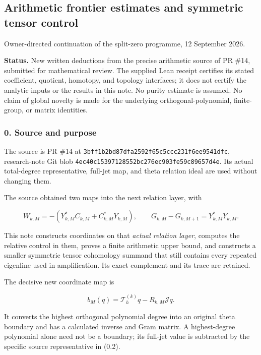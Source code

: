 


\subsection{Arithmetic frontier estimates and symmetric tensor
control}\label{symmetric_frontier:arithmetic-frontier-estimates-and-symmetric-tensor-control}

Owner-directed continuation of the split-zero programme, 12 September
2026.

\textbf{Status.} New written deductions from the precise arithmetic
source of PR \#14, submitted for mathematical review. The supplied Lean
receipt certifies its stated coefficient, quotient, homotopy, and
topology interfaces; it does not certify the analytic inputs or the
results in this note. No purity estimate is assumed. No claim of global
novelty is made for the underlying orthogonal-polynomial, finite-group,
or matrix identities.

\subsubsection{0. Source and purpose}\label{symmetric_frontier:source-and-purpose}

The source is PR \#14 at
\nolinkurl{3bff1b2bd87dfa2592f65c5ccc231f6ee9541dfc}, research-note Git
blob \nolinkurl{4ec40c15397128552bc276ec903fe59c89657d4e}. Its actual
total-degree representative, full-jet map, and theta relation ideal are
used without changing them.

The source obtained two maps into the next relation layer, with

\[W_{k,M}=-(Y_{k,M}^*C_{k,M}+C_{k,M}^*Y_{k,M}),\qquad
G_{k,M}-G_{k,M+1}=Y_{k,M}^*Y_{k,M}.\tag{0.1}\]

This note constructs coordinates on that \emph{actual relation layer},
computes the relative control in them, proves a finite arithmetic upper
bound, and constructs a smaller symmetric tensor cohomology summand that
still contains every repeated eigenline used in amplification. Its exact
complement and its trace are retained.

The decisive new coordinate map is

\[\boxed{b_M(q)=\mathcal T_h^{(k)}q-R_{k,M}\mathcal Jq.}\tag{0.2}\]

It converts the highest orthogonal polynomial degree into an original
theta boundary and has a calculated inverse and Gram matrix. A
highest-degree polynomial alone need not be a boundary; its full-jet
value is subtracted by the specific source representative in (0.2).

